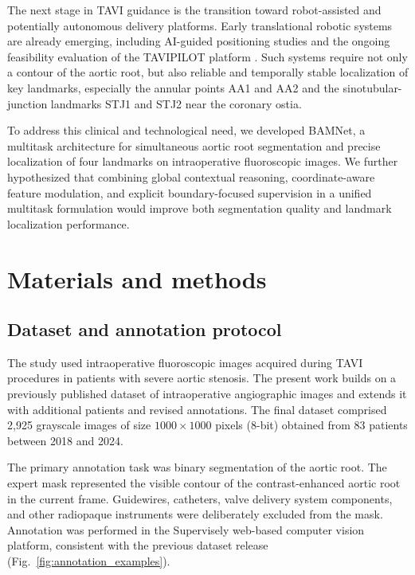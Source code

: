 \documentclass[preprint,12pt,authoryear]{elsarticle}
\begin{document}
The next stage in TAVI guidance is the transition toward robot-assisted and potentially autonomous delivery platforms. Early translational robotic systems are already emerging, including AI-guided positioning studies and the ongoing feasibility evaluation of the TAVIPILOT platform \citep{smits2025_autonomous,clinicaltrials_nct07152574}. Such systems require not only a contour of the aortic root, but also reliable and temporally stable localization of key landmarks, especially the annular points AA1 and AA2 and the sinotubular-junction landmarks STJ1 and STJ2 near the coronary ostia.

To address this clinical and technological need, we developed BAMNet, a multitask architecture for simultaneous aortic root segmentation and precise localization of four landmarks on intraoperative fluoroscopic images. We further hypothesized that combining global contextual reasoning, coordinate-aware feature modulation, and explicit boundary-focused supervision in a unified multitask formulation would improve both segmentation quality and landmark localization performance.

\section{Materials and methods}

\subsection{Dataset and annotation protocol}

The study used intraoperative fluoroscopic images acquired during TAVI procedures in patients with severe aortic stenosis. The present work builds on a previously published dataset of intraoperative angiographic images \citep{laptev2025_dataset} and extends it with additional patients and revised annotations. The final dataset comprised 2,925 grayscale images of size $1000 \times 1000$ pixels (8-bit) obtained from 83 patients between 2018 and 2024.

The primary annotation task was binary segmentation of the aortic root. The expert mask represented the visible contour of the contrast-enhanced aortic root in the current frame. Guidewires, catheters, valve delivery system components, and other radiopaque instruments were deliberately excluded from the mask. Annotation was performed in the Supervisely web-based computer vision platform, consistent with the previous dataset release (Fig.~\ref{fig:annotation_examples}).
\end{document}
